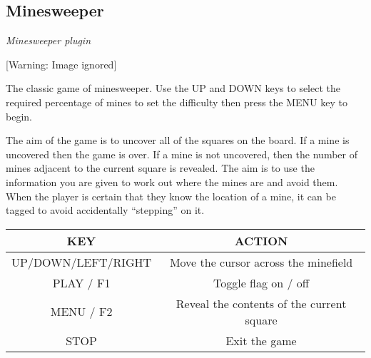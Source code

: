 \subsection{Minesweeper}
{\centering\itshape
Minesweeper plugin
\par}

\begin{center}
 [Warning: Image ignored] %

\end{center}
The classic game of minesweeper.  Use the UP and DOWN keys to select the
required percentage of mines to set the difficulty then press the MENU
key to begin.

The aim of the game is to uncover all of the squares on the board.  If a
mine is uncovered then the game is over.  If a mine is not uncovered,
then the number of mines adjacent to the current square is revealed. 
The aim is to use the information you are given to work out where the
mines are and avoid them.  When the player is certain that they know
the location of a mine, it can be tagged to avoid accidentally
``stepping'' on it.

\begin{table}[h!]
\begin{tabular}{|c|c|}
\hline
KEY & ACTION \\\hline
UP/DOWN/LEFT/RIGHT & Move the cursor across the minefield \\\hline
PLAY / F1 & Toggle flag on / off \\\hline
MENU / F2 & Reveal the contents of the current square \\\hline
STOP & Exit the game \\\hline
\end{tabular}
\end{table}

